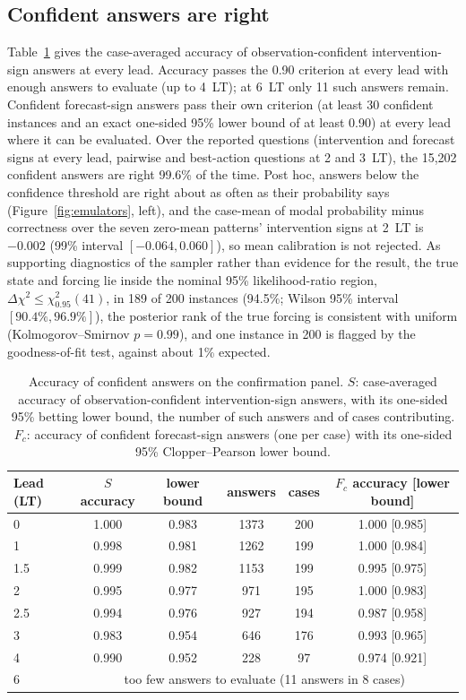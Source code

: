 \documentclass[11pt]{article}
\begin{document}
\subsection{Confident answers are right}
Table~\ref{tab:calibration} gives the case-averaged accuracy of observation-confident intervention-sign answers at every lead. Accuracy passes the 0.90 criterion at every lead with enough answers to evaluate (up to 4~LT); at 6~LT only 11 such answers remain. Confident forecast-sign answers pass their own criterion (at least 30 confident instances and an exact one-sided 95\% lower bound of at least 0.90) at every lead where it can be evaluated. Over the reported questions (intervention and forecast signs at every lead, pairwise and best-action questions at 2 and 3~LT), the 15,202 confident answers are right 99.6\% of the time. Post hoc, answers below the confidence threshold are right about as often as their probability says (Figure~\ref{fig:emulators}, left), and the case-mean of modal probability minus correctness over the seven zero-mean patterns' intervention signs at 2~LT is $-0.002$ (99\% interval $[-0.064, 0.060]$), so mean calibration is not rejected. As supporting diagnostics of the sampler rather than evidence for the result, the true state and forcing lie inside the nominal 95\% likelihood-ratio region, $\Delta\chi^2 \le \chi^2_{0.95}(41)$, in 189 of 200 instances (94.5\%; Wilson 95\% interval $[90.4\%, 96.9\%]$), the posterior rank of the true forcing is consistent with uniform (Kolmogorov--Smirnov $p = 0.99$), and one instance in 200 is flagged by the goodness-of-fit test, against about 1\% expected.

\begin{table}[t]
\centering
\small
\caption{Accuracy of confident answers on the confirmation panel. $S$: case-averaged accuracy of observation-confident intervention-sign answers, with its one-sided 95\% betting lower bound, the number of such answers and of cases contributing. $F_c$: accuracy of confident forecast-sign answers (one per case) with its one-sided 95\% Clopper--Pearson lower bound.}
\label{tab:calibration}
\begin{tabular}{lccccc}
\toprule
Lead (LT) & $S$ accuracy & lower bound & answers & cases & $F_c$ accuracy [lower bound] \\
\midrule
0   & 1.000 & 0.983 & 1373 & 200 & 1.000 [0.985] \\
1   & 0.998 & 0.981 & 1262 & 199 & 1.000 [0.984] \\
1.5 & 0.999 & 0.982 & 1153 & 199 & 0.995 [0.975] \\
2   & 0.995 & 0.977 & 971  & 195 & 1.000 [0.983] \\
2.5 & 0.994 & 0.976 & 927  & 194 & 0.987 [0.958] \\
3   & 0.983 & 0.954 & 646  & 176 & 0.993 [0.965] \\
4   & 0.990 & 0.952 & 228  & 97  & 0.974 [0.921] \\
6   & \multicolumn{5}{c}{too few answers to evaluate (11 answers in 8 cases)} \\
\bottomrule
\end{tabular}
\end{table}
\end{document}
